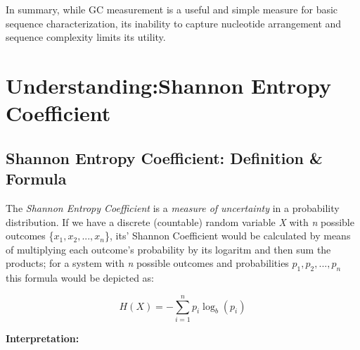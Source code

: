 \documentclass[
  letterpaper,
]{article}
\begin{document}
In summary, while GC measurement is a useful and simple measure for
basic sequence characterization, its inability to capture nucleotide
arrangement and sequence complexity limits its utility.

\section{\texorpdfstring{Understanding:\newline Shannon Entropy
Coefficient}{Understanding:Shannon Entropy Coefficient}}\label{understandingshannon-entropy-coefficient}

\subsection{Shannon Entropy Coefficient: Definition \&
Formula}\label{shannon-entropy-coefficient-definition-formula}

The \emph{Shannon Entropy Coefficient} is a \emph{measure of
uncertainty} in a probability distribution. If we have a discrete
(countable) random variable \emph{X} with \emph{n} possible outcomes
\{\(x_1, x_2, ..., x_n\)\}, its' Shannon Coefficient would be calculated
by means of multiplying each outcome's probability by its logaritm and
then sum the products; for a system with \emph{n} possible outcomes and
probabilities \(p_1, p_2, ..., p_n\) this formula would be depicted as:

\small

\begin{equation}
H(X) = -\sum_{i=1}^{n} p_i \log_b(p_i)
\end{equation} \normalsize

\textbf{Interpretation:}
\end{document}
